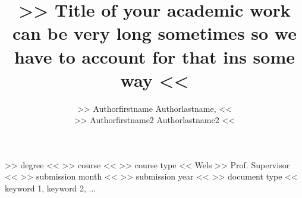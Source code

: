 	\title
		{>> Title of your academic work can be very long sometimes so we have to account for that ins some way <<}
	\author    %
		{>> Authorfirstname Authorlastname, << \\ >> Authorfirstname2 Authorlastname2 <<}


	\degree
		{>> degree <<}
	\course
		{>> course <<}
	\coursestype
		{>> course type <<}
	\location
		{Wels}
	\supervisor
		{>> Prof. Supervisor <<}
	\submonth
		{>> submission month <<}
	\subyear
		{>> submission year <<}
	\doctype
		{>> document type <<}
	\keywords
		{keyword 1, keyword 2, ...}